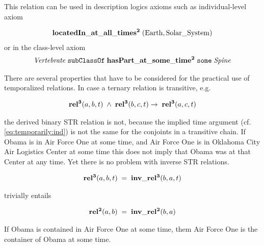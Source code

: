 This relation can be used in description logics axioms such as individual-level axiom

\begin{equation}
\begin{split}
\mathrm{\mathbf{locatedIn\_at\_all\_times^2}} \;(\mathrm{Earth}, \mathrm{Solar\_System})  
\end{split}
\label{eq:earth}
\end{equation}
%
or in the class-level axiom
%
\begin{equation}
\begin{split}
\mathit{Vertebrate}\;\mathtt{subClassOf}\;\mathrm{\mathbf{hasPart\_at\_some\_time^2}}\;\mathtt{some}\;\mathit{Spine}
\end{split}
\label{eq:Spine}
\end{equation}    

There are several properties that have to be considered for the practical use of temporalized relations. In case a ternary relation is transitive, e.g.  

\begin{equation}
\begin{split}
\mathrm{\mathbf{rel^3}}(a,b,t) \; \wedge \; \mathrm{\mathbf{rel^3}}(b,c,t) \rightarrow \; \mathrm{\mathbf{rel^3}}(a,c,t)   
\end{split}
\label{eq:trtrans}
\end{equation}    

the derived binary STR relation is not, because the implied time argument (cf. \ref{eq:temporarily:ind}) is not the same for the conjoints in a transitive chain. If Obama is in Air Force One at some time, and Air Force One is in Oklahoma City Air Logistics Center at some time this does not imply that Obama was at that Center at any time.
Yet there is no problem with inverse STR relations. 
 
\begin{equation}
\begin{split}
\mathrm{\mathbf{rel^3}}(a,b,t) \; = \; \mathrm{\mathbf{inv\_rel^3}}(b,a,t)  
\end{split}
\label{eq:trinv}
\end{equation}    

trivially entails

\begin{equation}
\begin{split}
\mathrm{\mathbf{rel^2}}(a,b) \; = \; \mathrm{\mathbf{inv\_rel^2}}(b,a)  
\end{split}
\label{eq:trinv2}
\end{equation}    

If Obama is contained in Air Force One at some time, them Air Force One is the container of Obama at some time.

